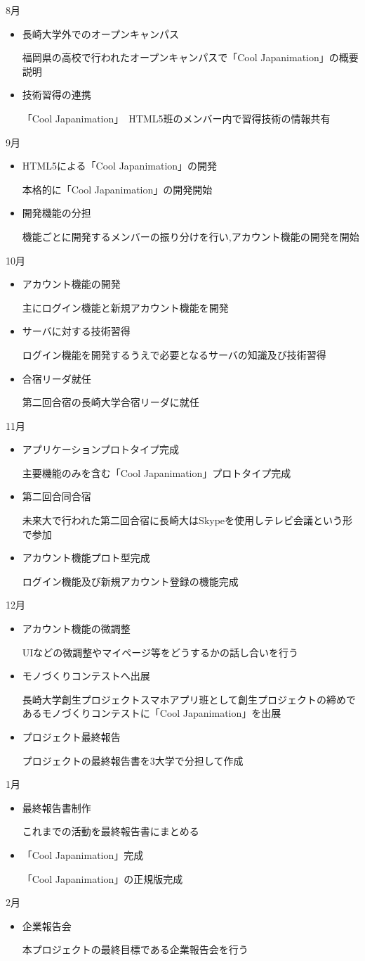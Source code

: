 8月
\begin{itemize}
\item 長崎大学外でのオープンキャンパス
\par 福岡県の高校で行われたオープンキャンパスで「Cool Japanimation」の概要説明
\item 技術習得の連携
\par 「Cool Japanimation」　HTML5班のメンバー内で習得技術の情報共有
\end{itemize}
9月
\begin{itemize}
\item HTML5による「Cool Japanimation」の開発
\par 本格的に「Cool Japanimation」の開発開始
\item 開発機能の分担
\par 機能ごとに開発するメンバーの振り分けを行い,アカウント機能の開発を開始
\end{itemize}
10月
\begin{itemize}
\item アカウント機能の開発
\par 主にログイン機能と新規アカウント機能を開発
\item サーバに対する技術習得
\par ログイン機能を開発するうえで必要となるサーバの知識及び技術習得
\item 合宿リーダ就任
\par 第二回合宿の長崎大学合宿リーダに就任
\end{itemize}
11月
\begin{itemize}
\item アプリケーションプロトタイプ完成
\par 主要機能のみを含む「Cool Japanimation」プロトタイプ完成
\item 第二回合同合宿
\par 未来大で行われた第二回合宿に長崎大はSkypeを使用しテレビ会議という形で参加
\item アカウント機能プロト型完成
\par ログイン機能及び新規アカウント登録の機能完成
\end{itemize}
12月
\begin{itemize}
\item アカウント機能の微調整
\par UIなどの微調整やマイページ等をどうするかの話し合いを行う
\item モノづくりコンテストへ出展
\par 長崎大学創生プロジェクトスマホアプリ班として創生プロジェクトの締めであるモノづくりコンテストに「Cool Japanimation」を出展
\item プロジェクト最終報告
\par プロジェクトの最終報告書を3大学で分担して作成
\end{itemize}
1月
\begin{itemize}
\item 最終報告書制作
\par これまでの活動を最終報告書にまとめる
\item 「Cool Japanimation」完成
\par 「Cool Japanimation」の正規版完成
\end{itemize}
2月
\begin{itemize}
\item 企業報告会
\par 本プロジェクトの最終目標である企業報告会を行う
\end{itemize}
